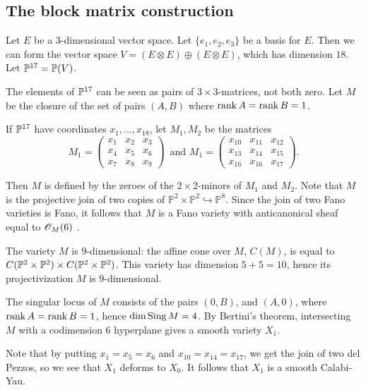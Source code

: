 \subsection{The block matrix construction}

Let $E$ be a 3-dimensional vector space. Let $\{e_1,e_2,e_3\}$ be a basis for $E$. Then we can form the vector space $V= (E \otimes E) \oplus (E \otimes E)$, which has dimension $18$. Let $\P^{17}=\P(V)$.

The elements of $\P^{17}$ can be seen as pairs of $3 \times 3$-matrices, not both zero. Let $M$ be the closure of the set of pairs $(A,B)$ where $\rank A = \rank B = 1$.  

If $\P^{17}$ have coordinates $x_1,\ldots,x_{18}$, let $M_1, M_2$ be the matrices
\[
M_1 = \begin{pmatrix}
x_1 & x_2 & x_3 \\
x_4 & x_5 & x_6 \\
x_7 & x_8 & x_9 
\end{pmatrix}\,
\text{ and }
M_1 = \begin{pmatrix}
x_{10} & x_{11} & x_{12} \\
x_{13} & x_{14} & x_{15} \\
x_{16} & x_{16} & x_{17}
\end{pmatrix}.
\]

Then $M$ is defined by the zeroes of the $2 \times 2$-minors of $M_1$ and $M_2$. Note that $M$ is the projective join of two copies of $\mathbb P^2 \times \mathbb P^2 \hookrightarrow \mathbb P^8$. Since the join of two Fano varieties is Fano, it follows that $M$ is a Fano variety with anticanonical sheaf equal to $\OO_{M}(6)$ .

The variety $M$ is $9$-dimensional: the affine cone over $M$, $C(M)$, is equal to $C(\mathbb P^2 \times \P^2) \times C(\mathbb P^2 \times \P^2)$. This variety has dimension $5+5=10$, hence its projectivization $M$ is $9$-dimensional. 

The singular locus of $M$ consists of the pairs $(0,B)$, and $(A,0)$, where $\rank A= \rank B = 1$, hence $\dim \sing M = 4$. By Bertini's theorem, intersecting $M$ with a codimension $6$ hyperplane gives a smooth variety $X_1$.

Note that by putting $x_1=x_5=x_6$ and $x_{10}=x_{14}=x_{17}$, we get the join of two del Pezzos, so we see that $X_1$ deforms to $X_0$. It follows that $X_1$ is a smooth Calabi-Yau.

